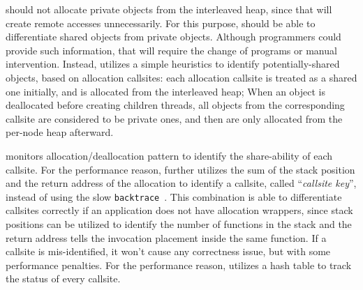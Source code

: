 \NA{} should not allocate private objects from the interleaved heap, since that will create remote accesses unnecessarily. For this purpose, \NM{} should be able to differentiate shared objects from private objects. Although programmers could provide such information, that will require the change of programs or manual intervention. Instead, \NM{} utilizes a simple heuristics to identify potentially-shared objects, based on allocation callsites: each allocation callsite is treated as a shared one initially, and is allocated from the interleaved heap; When an object is deallocated before creating children threads, all objects from the corresponding callsite are considered to be private ones, and then are only allocated from the per-node heap afterward. 

 \NM{} monitors allocation/deallocation pattern to identify the share-ability of each callsite. For the performance reason, \NA{} further utilizes the sum of the stack position and the return address of the allocation to identify a callsite, called ``\textit{callsite key}'', instead of using the slow \texttt{backtrace}~\cite{DBLP:conf/icse/SumnerZWZ10, DBLP:conf/cgo/ZengR0AJ014}. This combination is able to differentiate callsites correctly if an application does not have allocation wrappers, since stack positions can be utilized to identify the number of functions in the stack and the return address tells the invocation placement inside the same function. If a callsite is mis-identified, it won't cause any correctness issue, but with some performance penalties. For the performance reason, \NA{} utilizes a hash table to track the status of every callsite.
 

